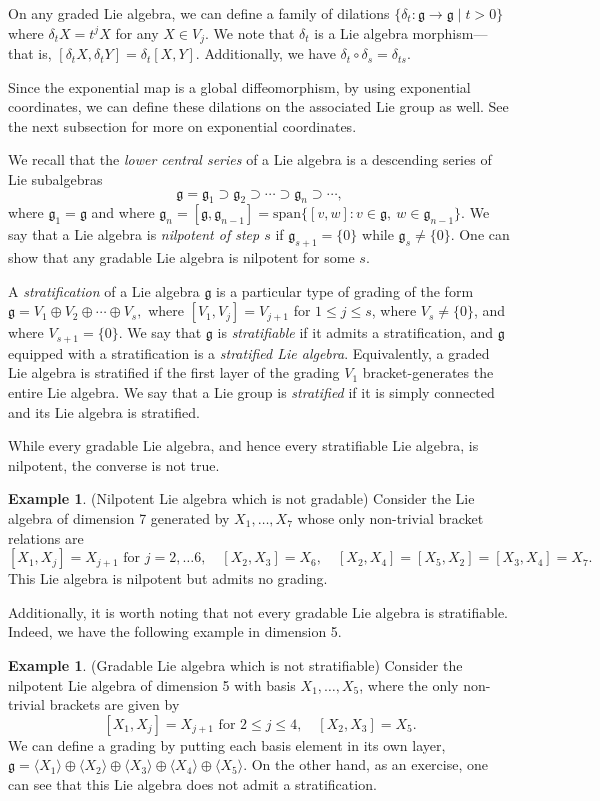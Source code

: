 \documentclass{article}
\theoremstyle{definition}
\newtheorem{ex}[theorem]{Example}
\newcommand{\g}{\mathfrak g}
\newcommand{\Span}{\mathrm{span}}
\begin{document}
On any graded Lie algebra, we can define a family of dilations $\{\delta_t: \g \to \g\mid t>0\}$ where $\delta_t X = t^j X$ for any $X \in V_j$. We note that $\delta_t$ is a Lie algebra morphism---that is, $[\delta_t X, \delta_t Y]= \delta_t[X,Y]$. Additionally, we have $\delta_t\circ \delta_s = \delta_{ts}$.

Since the exponential map is a global diffeomorphism, by using exponential coordinates, we can define these dilations on the associated Lie group as well. See the next subsection for more on exponential coordinates.

We recall that the {\em lower central series} of a Lie algebra is a descending series of Lie subalgebras
\[
\g = \g_1 \supset \g_2 \supset \cdots \supset \g_n \supset \cdots,
\]
where $\g_1 = \g$ and where $\g_n = [\g, \g_{n-1}] = \Span\{[v,w]:v\in \g,\ w\in \g_{n-1}\}$. We say that a Lie algebra is {\em nilpotent of step $s$} if $\g_{s+1} = \{0\}$ while $\g_s \neq \{0\}$. One can show that any gradable Lie algebra is nilpotent for some $s$.

A {\em stratification} of a Lie algebra $\g$ is a particular type of grading of the form
$\g = V_1 \oplus V_2 \oplus \cdots \oplus V_s,$
where $[V_1,V_j]=V_{j+1}$ for $1 \leq j \leq s$, where $V_s \neq \{0\}$, and where $V_{s+1} = \{0\}$. We say that $\g$ is {\em stratifiable} if it admits a stratification, and $\g$ equipped with a stratification is a {\em stratified Lie algebra}. Equivalently, a graded Lie algebra is stratified if the first layer of the grading $V_1$ bracket-generates the entire Lie algebra. We say that a Lie group is {\em stratified} if it is simply connected and its Lie algebra is stratified.

While every gradable Lie algebra, and hence every stratifiable Lie algebra, is nilpotent, the converse is not true.

\begin{ex}{(Nilpotent Lie algebra which is not gradable)}
Consider the Lie algebra of dimension 7 generated by $X_1, \ldots, X_7$ whose only non-trivial bracket relations are
\[
[X_1, X_j] = X_{j+1} \text{ for } j = 2,\ldots 6, \quad [X_2, X_3] = X_6, \quad [X_2,X_4] = [X_5, X_2] = [X_3,X_4] = X_7.
\]
This Lie algebra is nilpotent but admits no grading.
\end{ex}

Additionally, it is worth noting that not every gradable Lie algebra is stratifiable. Indeed, we have the following example in dimension 5.

\begin{ex}{(Gradable Lie algebra which is not stratifiable)}
Consider the nilpotent Lie algebra of dimension 5 with basis $X_1, \ldots, X_5$, where the only non-trivial brackets are given by
\[
[X_1, X_j] = X_{j+1} \text{ for } 2\leq j \leq 4, \quad [X_2,X_3] = X_5.
\]
We can define a grading by putting each basis element in its own layer,
$\g = \langle X_1\rangle \oplus \langle X_2\rangle \oplus \langle X_3\rangle \oplus \langle X_4\rangle \oplus  \langle X_5\rangle.$ 
On the other hand, as an exercise, one can see that this Lie algebra does not admit a stratification.
\end{ex} 
\end{document}
